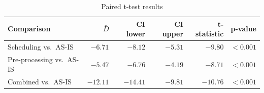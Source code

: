\begin{table}[H]
\centering
\begin{threeparttable}
\begin{tabular}{lrrrrr}
\toprule
\textbf{Comparison} & \textbf{$\bar{D}$} & \textbf{CI lower} & \textbf{CI upper} & \textbf{t-statistic} & \textbf{p-value} \\
\midrule
Scheduling vs.\ AS-IS      & $-6.71$  & $-8.12$  & $-5.31$ & $-9.80$  & $<0.001$ \\
Pre-processing vs.\ AS-IS  & $-5.47$  & $-6.76$  & $-4.19$ & $-8.71$  & $<0.001$ \\
Combined vs.\ AS-IS        & $-12.11$ & $-14.41$ & $-9.81$ & $-10.76$ & $<0.001$ \\
\bottomrule
\end{tabular}
\end{threeparttable}
\caption{Paired t-test results}
\label{tab:ttest}
\end{table}
